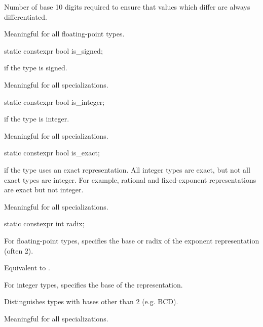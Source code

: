 \begin{itemdescr}
\pnum
Number of base 10 digits required to ensure that values which
differ are always differentiated.

\pnum
Meaningful for all floating-point types.
\end{itemdescr}

%
\begin{itemdecl}
static constexpr bool is_signed;
\end{itemdecl}

\begin{itemdescr}
\pnum
{} if the type is signed.

\pnum
Meaningful for all specializations.
\end{itemdescr}

%
\begin{itemdecl}
static constexpr bool is_integer;
\end{itemdecl}

\begin{itemdescr}
\pnum
{} if the type is integer.

\pnum
Meaningful for all specializations.
\end{itemdescr}

%
\begin{itemdecl}
static constexpr bool is_exact;
\end{itemdecl}

\begin{itemdescr}
\pnum
{} if the type uses an exact representation.
All integer types are exact, but not all exact types are integer.
For example, rational and fixed-exponent representations are exact but not integer.

\pnum
Meaningful for all specializations.
\end{itemdescr}

%
\begin{itemdecl}
static constexpr int radix;
\end{itemdecl}

\begin{itemdescr}
\pnum
For floating-point types, specifies the base or radix of the exponent representation
(often 2).
\begin{footnote}
Equivalent to .
\end{footnote}

\pnum
For integer types, specifies the base of the
representation.
\begin{footnote}
Distinguishes types with bases other than 2 (e.g.
BCD).
\end{footnote}

\pnum
Meaningful for all specializations.
\end{itemdescr}

